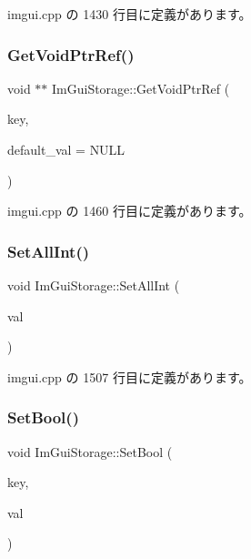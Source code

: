  imgui.\+cpp の 1430 行目に定義があります。

\mbox{\label{struct_im_gui_storage_a2b203317f3f488818e9b9f416fe35332}} 
\subsubsection{\texorpdfstring{Get\+Void\+Ptr\+Ref()}{GetVoidPtrRef()}}
{\footnotesize\ttfamily void $\ast$$\ast$ Im\+Gui\+Storage\+::\+Get\+Void\+Ptr\+Ref (\begin{DoxyParamCaption}\item[{\mbox{\hyperlink{imgui_8h_a1785c9b6f4e16406764a85f32582236f}{Im\+Gui\+ID}}}]{key,  }\item[{void $\ast$}]{default\+\_\+val = {\ttfamily NULL} }\end{DoxyParamCaption})}



 imgui.\+cpp の 1460 行目に定義があります。

\mbox{\label{struct_im_gui_storage_ae5ee60618c4ce8e2b4ce0e5543d52992}} 
\subsubsection{\texorpdfstring{Set\+All\+Int()}{SetAllInt()}}
{\footnotesize\ttfamily void Im\+Gui\+Storage\+::\+Set\+All\+Int (\begin{DoxyParamCaption}\item[{int}]{val }\end{DoxyParamCaption})}



 imgui.\+cpp の 1507 行目に定義があります。

\mbox{\label{struct_im_gui_storage_ac5beee31a59b3f5294b41992717be7bf}} 
\subsubsection{\texorpdfstring{Set\+Bool()}{SetBool()}}
{\footnotesize\ttfamily void Im\+Gui\+Storage\+::\+Set\+Bool (\begin{DoxyParamCaption}\item[{\mbox{\hyperlink{imgui_8h_a1785c9b6f4e16406764a85f32582236f}{Im\+Gui\+ID}}}]{key,  }\item[{bool}]{val }\end{DoxyParamCaption})}



